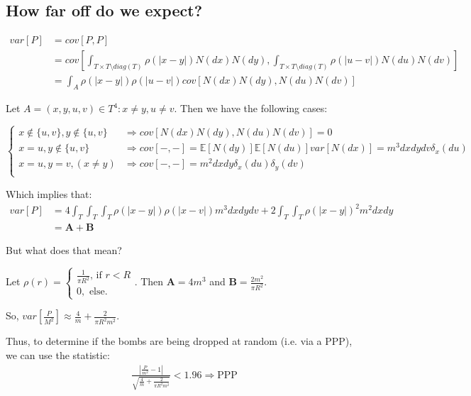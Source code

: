 \documentclass[12pt]{article}
\begin{document}
\subsection*{How far off do we expect?}

$$\begin{aligned}
var[P] &= cov[P,P] \\
&= cov[\int_{T\times T \setminus diag(T)}\rho(|x-y|) N(dx)N(dy), \int_{T\times T \setminus diag(T)}\rho(|u-v|)N(du)N(dv)] \\ 
&= \int_A\rho(|x-y|)\rho(|u-v|) cov[N(dx)N(dy),N(du)N(dv)]
\end{aligned}$$

Let $A=(x,y,u,v) \in T^4 : x\neq y, u\neq v$. Then we have the following cases:

$$\begin{cases}
x\notin \{u,v\}, y\notin \{u,v\} &\Rightarrow cov[N(dx) N(dy), N(du)N(dv)] = 0\\
x=u, y\notin\{u,v\} 		  &\Rightarrow cov[-,-] = \mathbb{E}[N(dy)]\mathbb{E}[N(du)]var[N(dx)] = m^3dxdydv\delta_x(du)\\
x=u,y=v, (x\neq y)		  &\Rightarrow cov[-,-] = m^2dxdy \delta_x(du)\delta_y(dv)\\
\end{cases}$$

Which implies that:
\
$$\begin{aligned}
var[P] &= 4\int_T \int_T\int_T \rho (|x-y|) \rho(|x-v|)m^3 dxdydv + 2\int_T\int_T\rho (|x-y|)^2 m^2dxdy\\
	&= \mathbf{A} + \mathbf{B}
\end{aligned}$$

But what does that mean?

Let $\rho(r) = \begin{cases} \frac{1}{\pi R^2} \text{, if } r<R  \\  0, \text{  else.} \end{cases}$. Then $\mathbf{A} = 4m^3$ and $\mathbf{B}=\frac{2m^2}{\pi R^2}$.

So, $var[\frac{P}{M^2}] \approx \frac{4}{m} + \frac{2}{\pi R^2 m^2} $.

Thus, to determine if the bombs are being dropped at random (i.e. via a PPP), we can use the statistic:
$$\begin{aligned}
\frac{| \frac{P}{m^2} - 1 |} {\sqrt{ \frac{4}{m} + \frac{2}{\pi R^2 m^2} }} < 1.96 \Rightarrow \text{PPP}
\end{aligned}$$
\end{document}
